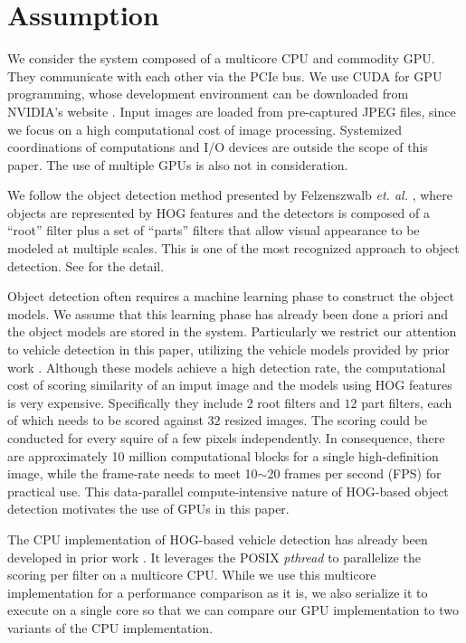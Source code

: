 \section{Assumption}
\label{sec:assumption}

We consider the system composed of a multicore CPU and commodity GPU.
They communicate with each other via the PCIe bus.
We use CUDA \cite{NVIDIA_CUDA} for GPU programming, whose development
environment can be downloaded from NVIDIA's website \cite{NVIDIA_NVCC}.
Input images are loaded from pre-captured JPEG files, since we focus on
a high computational cost of image processing.
Systemized coordinations of computations and I/O devices are outside the
scope of this paper.
The use of multiple GPUs is also not in consideration.

We follow the object detection method presented by Felzenszwalb
\textit{et. al.} \cite{Felzenszwalb10}, where objects are represented by
HOG features \cite{Dalal05} and the detectors is composed of a ``root''
filter plus a set of ``parts'' filters that allow visual appearance to
be modeled at multiple scales.
This is one of the most recognized approach to object detection.
See \cite{Felzenszwalb10} for the detail.

Object detection often requires a machine learning phase to construct
the object models.
We assume that this learning phase has already been done a priori and
the object models are stored in the system.
Particularly we restrict our attention to vehicle detection in this
paper, utilizing the vehicle models provided by prior work
\cite{Niknejad12}.
Although these models achieve a high detection rate, the computational
cost of scoring similarity of an imput image and the models using HOG
features is very expensive.
Specifically they include $2$ root filters and $12$ part filters, each
of which needs to be scored against $32$ resized images.
The scoring could be conducted for every squire of a few pixels
independently.
In consequence, there are approximately 10 million computational
blocks for a single high-definition image, while the frame-rate needs to
meet 10$\sim$20 frames per second (FPS) for practical use.
This data-parallel compute-intensive nature of HOG-based object
detection motivates the use of GPUs in this paper.

The CPU implementation of HOG-based vehicle detection has already been
developed in prior work \cite{Niknejad12}.
It leverages the POSIX \textit{pthread} to parallelize the scoring per
filter on a multicore CPU.
While we use this multicore implementation for a performance comparison
as it is, we also serialize it to execute on a single core so that we
can compare our GPU implementation to two variants of the CPU
implementation.
